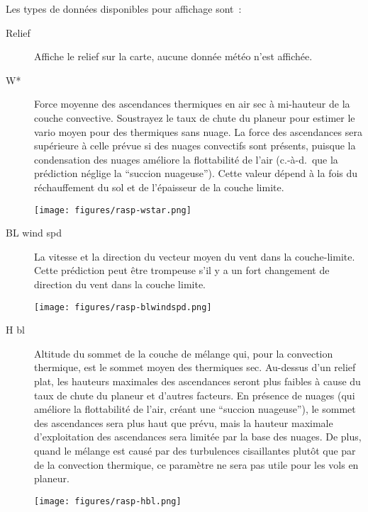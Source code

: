Les types de données disponibles pour affichage sont~:
\begin{description}
\item[Relief] Affiche le relief sur la carte, aucune donnée météo n'est affichée.

\item[W*] 
Force moyenne des ascendances thermiques en air sec à mi-hauteur de la couche convective.
Soustrayez le taux de chute du planeur pour estimer le vario moyen pour des thermiques sans nuage.
La force des ascendances sera supérieure à celle prévue si des nuages convectifs sont présents, puisque la condensation des nuages améliore la flottabilité de l'air (c.-à-d.\ que la prédiction néglige la ``succion nuageuse''). %
Cette valeur dépend à la fois du réchauffement du sol et de l'épaisseur de la couche limite.

\begin{center}
\texttt{[image: figures/rasp-wstar.png]}
\end{center}

\item[BL wind spd]
La vitesse et la direction du vecteur moyen du vent dans la couche-limite.
Cette prédiction peut être trompeuse s'il y a un fort changement de direction du vent dans la couche limite.

\begin{center}
\texttt{[image: figures/rasp-blwindspd.png]}
\end{center}

\item[H bl]  
Altitude du sommet de la couche de mélange qui, pour la convection thermique, est le sommet moyen des thermiques sec.
Au-dessus d'un relief plat, les hauteurs maximales des ascendances seront plus faibles à cause du taux de chute du planeur et d'autres facteurs.
En présence de nuages (qui améliore la flottabilité de l'air, créant une ``succion nuageuse''), le sommet des ascendances sera plus haut que prévu, mais la hauteur maximale d'exploitation des ascendances sera limitée par la base des nuages.
De plus, quand le mélange est causé par des turbulences cisaillantes plutôt que par de la convection thermique, ce paramètre ne sera pas utile pour les vols en planeur.

\begin{center}
\texttt{[image: figures/rasp-hbl.png]}
\end{center}


\end{description}
